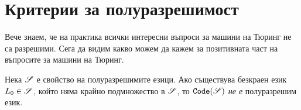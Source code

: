 \section{Критерии за полуразрешимост}

Вече знаем, че на практика всички интересни въпроси за машини на Тюринг не са разрешими.
Сега да видим какво можем да кажем за позитивната част на въпросите за машини на Тюринг.

\begin{lemma}\label{lem:rice-shapiro:finite}
  Нека $\mathscr{S}$ е свойство на полуразрешимите езици.
  Ако съществува безкраен език $L_0 \in \mathscr{S}$, който няма крайно подмножество в $\mathscr{S}$,
  то $\texttt{Code}(\mathscr{S})$ {\em не е} полуразрешим език.  
\end{lemma}
